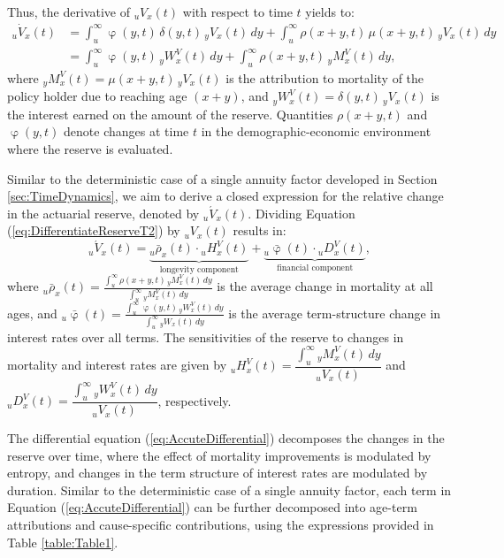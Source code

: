 \documentclass[12pt]{article}
\begin{document}
Thus, the derivative of ${}_u{V}_x(t)$ with respect to time $t$ yields to:
\begin{equation}\label{eq:DifferentiateReserveT2}
	\begin{split}
		{}_u\dot{V}_x(t) &= \int_u^\infty \upvarphi(y,t) \, \delta(y,t) \, {}_yV_x(t) \, dy + \int_u^\infty \rho(x+y,t) \, \mu(x+y,t) \, {}_yV_x(t) \, dy \\ 
		&= \int_u^\infty \upvarphi(y,t) \, {}_yW^V_x(t) \, dy + \int_u^\infty \rho(x+y,t) \, {}_yM^V_x(t) \, dy,
	\end{split}
\end{equation}
where ${}_yM^V_x(t) = \mu(x+y,t) \, {}_yV_x(t)$ is the attribution to mortality of the policy holder due to reaching age $(x+y)$, and ${}_yW^V_x(t) = \delta(y,t) \, {}_yV_x(t)$ is the interest earned on the amount of the reserve. Quantities $\rho(x+y,t)$ and $\upvarphi(y,t)$ denote changes at time $t$ in the demographic-economic environment where the reserve is evaluated. 
\color{black}


Similar to the deterministic case of a single annuity factor developed in Section \ref{sec:TimeDynamics}, we aim to derive a closed expression for the relative change in the actuarial reserve, denoted by ${}_u\acute{V}_x(t)$. Dividing Equation (\ref{eq:DifferentiateReserveT2}) by ${}_uV_x(t)$ results in:
\begin{equation}\label{eq:AccuteDifferential}
	{}_u\acute{V}_x(t) = \underbrace{{}_u\bar{\rho}_x(t) \cdot {}_uH_x^V(t)}_\text{longevity component} + \underbrace{{}_u\bar{\upvarphi}(t) \cdot {}_uD_x^V(t)}_\text{financial component},
\end{equation}
where ${}_u\bar{\rho}_x(t) = \frac{\int_u^\infty \rho(x+y,t) \, {}_yM^V_x(t) \, dy}{\int_u^\infty {}_yM^V_x(t) \, dy}$ is the average change in mortality at all ages, and ${}_u\bar{\upvarphi}(t) = \frac{\int_u^\infty \upvarphi(y,t) \, {}_yW^V_x(t) \, dy}{\int_u^\infty {}_yW_x(t) \, dy}$ is the average term-structure change in interest rates over all terms. The sensitivities of the reserve to changes in mortality and interest rates are given by ${}_uH_x^V(t) = \dfrac{\int_{u}^{\infty} {}_yM^V_x(t) \, dy}{{}_uV_x(t)}$ and ${}_uD_x^V(t) = \dfrac{\int_{u}^{\infty} {}_yW^V_x(t) \, dy}{{}_uV_x(t)}$, respectively.

The differential equation (\ref{eq:AccuteDifferential}) decomposes the changes in the reserve over time, where the effect of mortality improvements is modulated by entropy, and changes in the term structure of interest rates are modulated by duration. Similar to the deterministic case of a single annuity factor, each term in Equation (\ref{eq:AccuteDifferential}) can be further decomposed into age-term attributions and cause-specific contributions, using the expressions provided in Table \ref{table:Table1}.
\end{document}
